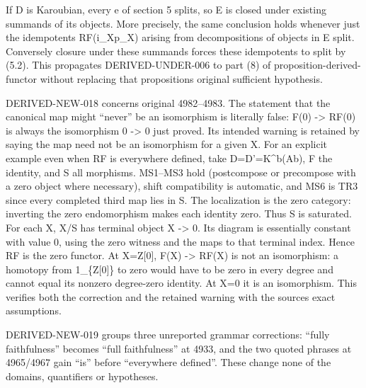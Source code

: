 If D\textquotesingle{} is Karoubian,\allowbreak{} every e of section 5 splits,\allowbreak{} so E is closed under existing summands of its objects. More precisely,\allowbreak{} the same conclusion holds whenever just the idempotents RF(i\_\allowbreak{}Xp\_\allowbreak{}X)\allowbreak{} arising from decompositions of objects in E split. Conversely closure under these summands forces these idempotents to split by (5.2)\allowbreak{}. This propagates DERIVED-UNDER-006 to part (8)\allowbreak{} of proposition-derived-functor without replacing that proposition\textquotesingle s original sufficient hypothesis.

DERIVED-NEW-018 concerns original 4982–\allowbreak{}4983. The statement that the canonical map might ``never'' be an isomorphism is literally false:\allowbreak{} F(0)\allowbreak{} \allowbreak{}-> RF(0)\allowbreak{} is always the isomorphism 0 \allowbreak{}-> 0 just proved. Its intended warning is retained by saying the map need not be an isomorphism for a given X. For an explicit example even when RF is everywhere defined,\allowbreak{} take D\allowbreak{}=D'\allowbreak{}=K\textasciicircum{}b(Ab)\allowbreak{},\allowbreak{} F the identity,\allowbreak{} and S all morphisms. MS1–\allowbreak{}MS3 hold (postcompose or precompose with a zero object where necessary)\allowbreak{},\allowbreak{} shift compatibility is automatic,\allowbreak{} and MS6 is TR3 since every completed third map lies in S. The localization is the zero category:\allowbreak{} inverting the zero endomorphism makes each identity zero. Thus S is saturated. For each X,\allowbreak{} X/\allowbreak{}S has terminal object X \allowbreak{}-> 0. Its diagram is essentially constant with value 0,\allowbreak{} using the zero witness and the maps to that terminal index. Hence RF is the zero functor. At X\allowbreak{}=Z[0]\allowbreak{},\allowbreak{} F(X)\allowbreak{} \allowbreak{}-> RF(X)\allowbreak{} is not an isomorphism:\allowbreak{} a homotopy from 1\_\allowbreak{}\{Z[0]\allowbreak{}\} to zero would have to be zero in every degree and cannot equal its nonzero degree-zero identity. At X\allowbreak{}=0 it is an isomorphism. This verifies both the correction and the retained warning with the source\textquotesingle s exact assumptions.

DERIVED-NEW-019 groups three unreported grammar corrections:\allowbreak{} ``fully faithfulness'' becomes ``full faithfulness'' at 4933,\allowbreak{} and the two quoted phrases at 4965/\allowbreak{}4967 gain ``is'' before ``everywhere defined''. These change none of the domains,\allowbreak{} quantifiers or hypotheses.

